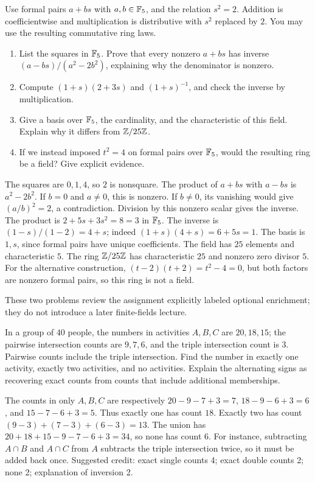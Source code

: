 Use formal pairs $a+bs$ with $a,b\in\mathbb F_5$, and the relation $s^2=2$.
Addition is coefficientwise and multiplication is distributive with
$s^2$ replaced by $2$. You may use the resulting commutative ring laws.
\begin{enumerate}
\item List the squares in $\mathbb F_5$. Prove that every nonzero $a+bs$
has inverse $(a-bs)/(a^2-2b^2)$, explaining why the denominator is
nonzero. 
\item Compute $(1+s)(2+3s)$ and $(1+s)^{-1}$, and check the inverse
by multiplication. 
\item Give a basis over $\mathbb F_5$, the cardinality, and the characteristic
of this field. Explain why it differs from $\mathbb Z/25\mathbb Z$. 
\item If we instead imposed $t^2=4$ on formal pairs over $\mathbb F_5$,
would the resulting ring be a field? Give explicit evidence. 
\end{enumerate}
\begin{solution}
The squares are $0,1,4$, so $2$ is nonsquare. The product of $a+bs$
with $a-bs$ is $a^2-2b^2$. If $b=0$ and $a\ne0$, this is nonzero.
If $b\ne0$, its vanishing would give $(a/b)^2=2$, a contradiction.
Division by this nonzero scalar gives the inverse.
The product is $2+5s+3s^2=8=3$ in $\mathbb F_5$.
The inverse is $(1-s)/(1-2)=4+s$; indeed
$(1+s)(4+s)=6+5s=1$.
The basis is $1,s$, since formal pairs have unique coefficients.
The field has $25$ elements and characteristic $5$.
The ring $\mathbb Z/25\mathbb Z$ has characteristic $25$ and nonzero zero divisor $5$.
For the alternative construction, $(t-2)(t+2)=t^2-4=0$, but both
factors are nonzero formal pairs, so this ring is not a field.
\end{solution}

\studentbreak
{}
These two problems review the assignment explicitly labeled optional
enrichment; they do not introduce a later finite-fields lecture.

In a group of $40$ people, the numbers in activities $A,B,C$ are
$20,18,15$; the pairwise intersection counts are $9,7,6$, and the triple
intersection count is $3$. Pairwise counts include the triple intersection.
Find the number in exactly one activity, exactly two activities, and no
activities. Explain the alternating signs as recovering exact counts
from counts that include additional memberships.
\begin{solution}
The counts in only $A,B,C$ are respectively
$20-9-7+3=7$, $18-9-6+3=6$, and $15-7-6+3=5$.
Thus exactly one has count $18$. Exactly two has count
$(9-3)+(7-3)+(6-3)=13$. The union has
$20+18+15-9-7-6+3=34$, so none has count $6$.
For instance, subtracting $A\cap B$ and $A\cap C$ from $A$ subtracts
the triple intersection twice, so it must be added back once.
Suggested credit: exact single counts 4; exact double counts 2; none 2;
explanation of inversion 2.
\end{solution}

